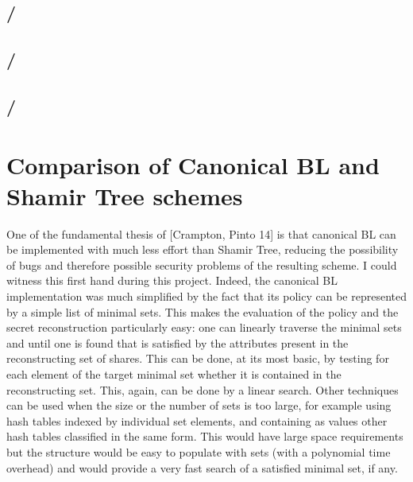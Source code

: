 \documentclass{article}
\begin{document}
\subsection{\fhblcanon / \fcblcanon}

\subsection{\fhtree / \fctree}

\subsection{\fhshtree / \fcshtree}

\section{Comparison of Canonical BL and Shamir Tree schemes}

One of the fundamental thesis of [Crampton, Pinto 14] is that canonical BL can be implemented with much less effort than Shamir Tree, reducing the possibility of bugs and therefore possible security problems of the resulting scheme. I could witness this first hand during this project. Indeed, the canonical BL implementation was much simplified by the fact that its policy can be represented by a simple list of minimal sets. This makes the evaluation of the policy and the secret reconstruction particularly easy: one can linearly traverse the minimal sets and until one is found that is satisfied by the attributes present in the reconstructing set of shares. This can be done, at its most basic, by testing for each element of the target minimal set whether it is contained in the reconstructing set. This, again, can be done by a linear search. Other techniques can be used when the size or the number of sets is too large, for example using hash tables indexed by individual set elements, and containing as values other hash tables classified in the same form. This would have large space requirements but the structure would be easy to populate with sets (with a polynomial time overhead) and would provide a very fast search of a satisfied minimal set, if any.
\end{document}

